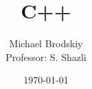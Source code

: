 


\def\code#1{\texttt{#1}}

\pagestyle{fancy}

\title{C++}
\date{\today}
\author{Michael Brodskiy\\ \small Professor: S. Shazli}



\maketitle

\thispagestyle{fancy}

\newpage

